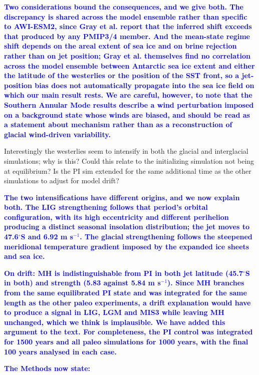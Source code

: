 \documentclass[pdflatex,sn-nature]{sn-jnl}
\begin{document}
\noindent\textcolor{blue}{\textbf{Two considerations bound the consequences, and we give both. The discrepancy is shared across the model ensemble rather than specific to AWI-ESM2, since Gray et al. report that the inferred shift exceeds that produced by any PMIP3/4 member. And the mean-state regime shift depends on the areal extent of sea ice and on brine rejection rather than on jet position; Gray et al. themselves find no correlation across the model ensemble between Antarctic sea ice extent and either the latitude of the westerlies or the position of the SST front, so a jet-position bias does not automatically propagate into the sea ice field on which our main result rests. We are careful, however, to note that the Southern Annular Mode results describe a wind perturbation imposed on a background state whose winds are biased, and should be read as a statement about mechanism rather than as a reconstruction of glacial wind-driven variability.}}


\medskip
\noindent Interestingly the westerlies seem to intensify in both the glacial and interglacial simulations; why is this? Could this relate to the initializing simulation not being at equilibrium? Is the PI sim extended for the same additional time as the other simulations to adjust for model drift?
\medskip

\noindent\textcolor{blue}{\textbf{The two intensifications have different origins, and we now explain both. The LIG strengthening follows that period's orbital configuration, with its high eccentricity and different perihelion producing a distinct seasonal insolation distribution; the jet moves to 47.6$^\circ$S and 6.92 m s$^{-1}$. The glacial strengthening follows the steepened meridional temperature gradient imposed by the expanded ice sheets and sea ice.}}


\noindent\textcolor{blue}{\textbf{On drift: MH is indistinguishable from PI in both jet latitude (45.7$^\circ$S in both) and strength (5.83 against 5.84 m s$^{-1}$). Since MH branches from the same equilibrated PI state and was integrated for the same length as the other paleo experiments, a drift explanation would have to produce a signal in LIG, LGM and MIS3 while leaving MH unchanged, which we think is implausible. We have added this argument to the text. For completeness, the PI control was integrated for 1500 years and all paleo simulations for 1000 years, with the final 100 years analysed in each case.}}


\noindent\textcolor{blue}{\textbf{The Methods now state:}}
\end{document}
